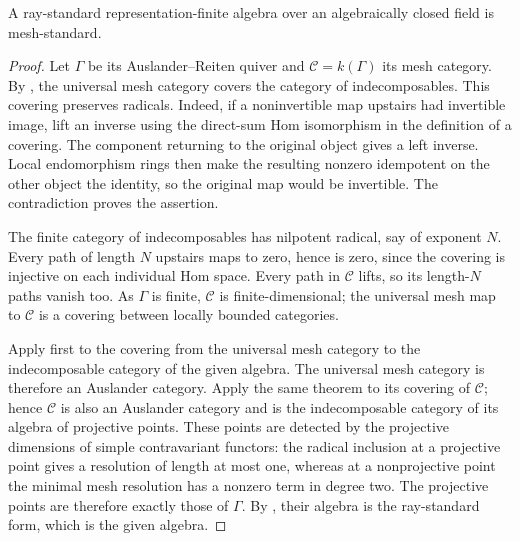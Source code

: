 \begin{lemma}\label{lem:ray-mesh}
A ray-standard representation-finite algebra over an algebraically closed field is mesh-standard.
\end{lemma}
\begin{proof}
Let $\Gamma$ be its Auslander--Reiten quiver and $\mathcal C=k(\Gamma)$ its mesh category. By \cite[Theorem 14]{Bongartz13}, the universal mesh category covers the category of indecomposables. This covering preserves radicals. Indeed, if a noninvertible map upstairs had invertible image, lift an inverse using the direct-sum Hom isomorphism in the definition of a covering. The component returning to the original object gives a left inverse. Local endomorphism rings then make the resulting nonzero idempotent on the other object the identity, so the original map would be invertible. The contradiction proves the assertion.

The finite category of indecomposables has nilpotent radical, say of exponent $N$. Every path of length $N$ upstairs maps to zero, hence is zero, since the covering is injective on each individual Hom space. Every path in $\mathcal C$ lifts, so its length-$N$ paths vanish too. As $\Gamma$ is finite, $\mathcal C$ is finite-dimensional; the universal mesh map to $\mathcal C$ is a covering between locally bounded categories.

Apply \cite[Theorem 15]{Bongartz13} first to the covering from the universal mesh category to the indecomposable category of the given algebra. The universal mesh category is therefore an Auslander category. Apply the same theorem to its covering of $\mathcal C$; hence $\mathcal C$ is also an Auslander category and is the indecomposable category of its algebra of projective points. These points are detected by the projective dimensions of simple contravariant functors: the radical inclusion at a projective point gives a resolution of length at most one, whereas at a nonprojective point the minimal mesh resolution has a nonzero term in degree two. The projective points are therefore exactly those of $\Gamma$. By \cite[Theorem 18(c),(d)]{Bongartz13}, their algebra is the ray-standard form, which is the given algebra.
\end{proof}


